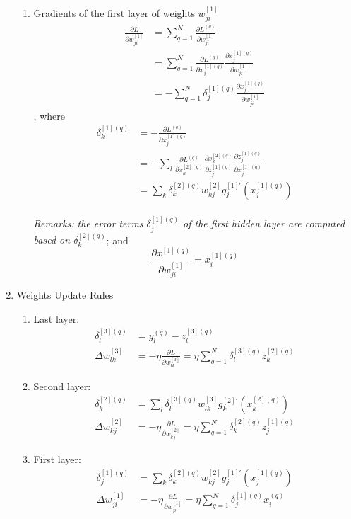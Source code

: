 \documentclass[11pt]{article}
\newcommand\pddx[2]{\frac{\partial{#1}}{\partial{#2}}}
\begin{document}
\begin{enumerate}
\begin{enumerate}
\item Gradients of the first layer of weights $w_{ji}^{[1]}$
\begin{align*}
\pddx{L}{w_{ji}^{[1]}} &= \sum_{q=1}^{N} \pddx{L^{(q)}}{w_{ji}^{[1]}}\\
&= \sum_{q=1}^{N} \pddx{L^{(q)}}{x_j ^{[1](q)}}\pddx{x_j ^{[1](q)}}{w_{ji}^{[1]}}\\
&= - \sum_{q=1}^{N} \delta^{[1](q)}_j \pddx{x_j ^{[1](q)}}{w_{ji}^{[1]}}
\end{align*}, where \begin{align*}
\delta^{[1](q)}_k &= - \pddx{L^{(q)}}{x^{[1](q)}_j}\\
&= - \sum_{l} \pddx{L^{(q)}}{x^{[2](q)}_k} \pddx{x^{[2](q)}_k}{z^{[1](q)}_j} \pddx{z^{[1](q)}_j}{x^{[1](q)}_j}\\
&= \sum_{k} \delta^{[2](q)}_k w^{[2]}_{kj} g^{[1]'}_j (x^{[1](q)}_j)
\end{align*}\\ \textit{Remarks: the error terms $\delta_{j}^{[1](q)}$ of the first hidden layer are computed based on $\delta^{[2](q)}_k$}; and $$\pddx{x^{[1](q)}}{w^{[1]}_{ji}} = x^{[1](q)}_i$$
\end{enumerate}
\item Weights Update Rules
\begin{enumerate}
\item Last layer: \begin{align*}
\delta_{l}^{[3](q)} &= y^{(q)}_{l} - z^{[3](q)}_l\\
\Delta w^{[3]}_{lk} &= -\eta \pddx{L}{w^{[3]}_{lk}} = \eta \sum_{q=1}^{N} \delta^{[3](q)}_{l} z^{[2](q)}_k
\end{align*}
\item Second layer: \begin{align*}
\delta_{k}^{[2](q)} &= \sum_{l} \delta^{[3](q)}_l w^{[3]}_{lk} g^{[2]'}_k (x^{[2](q)}_k)\\
\Delta w^{[2]}_{kj} &= -\eta \pddx{L}{w^{[2]}_{kj}} = \eta \sum_{q=1}^{N} \delta^{[2](q)}_k z^{[1](q)}_j
\end{align*}
\item First layer: \begin{align*}
\delta_{j}^{[1](q)} &= \sum_{k} \delta^{[2](q)}_k w^{[2]}_{kj} g^{[1]'}_j (x^{[1](q)}_j)\\
\Delta w^{[1]}_{ji} &= -\eta \pddx{L}{w^{[1]}_{ji}} = \eta \sum_{q=1}^{N} \delta^{[1](q)}_j x^{(q)}_i
\end{align*}
\end{enumerate}


\end{enumerate}
\end{document}
